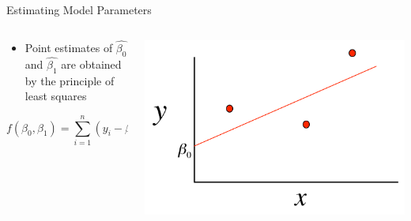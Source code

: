 \documentclass[australian,ignorenonframetext,aspectratio=169]{beamer}
\providecommand{\tightlist}{%
  \setlength{\itemsep}{0pt}\setlength{\parskip}{0pt}}
\begin{document}
\begin{frame}{Estimating Model Parameters}
\protect\hypertarget{estimating-model-parameters}{}

\begin{columns}[T]
\begin{column}{0.5\textwidth}
\begin{itemize}
\tightlist
\item
  Point estimates of \(\hat{\beta_0}\) and \(\hat{\beta_1}\) are
  obtained by the principle of least squares
\end{itemize}

\[f(\beta_0, \beta_1) = \sum_{i=1}^n (y_i - \beta_0 - \beta_1x_i)^2\]
\end{column}

\begin{column}{0.5\textwidth}
\begin{center}\includegraphics[width=1\linewidth]{../graphs/estimating} \end{center}
\end{column}
\end{columns}

\end{frame}
\end{document}
